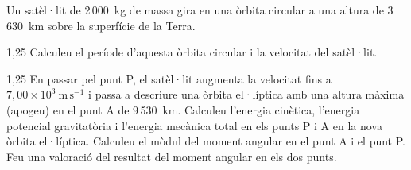 Un satèl·lit de 2\,000~kg de massa gira en una òrbita circular a una altura de 3\,630~km sobre la superfície de la Terra.

\begin{apartat}{1,25}
Calculeu el període d'aquesta òrbita circular i la velocitat del satèl·lit.
\end{apartat}


\begin{apartat}{1,25}
En passar pel punt P, el satèl·lit augmenta la velocitat fins a $7,00\times 10^{3}\ \mathrm{m\,s^{-1}}$ i passa a descriure una òrbita el·líptica amb una altura màxima (apogeu) en el punt A de 9\,530~km. Calculeu l'energia cinètica, l'energia potencial gravitatòria i l'energia mecànica total en els punts P i A en la nova òrbita el·líptica. Calculeu el mòdul del moment angular en el punt A i el punt P. Feu una valoració del resultat del moment angular en els dos punts.
\end{apartat}


